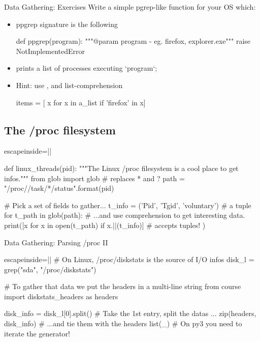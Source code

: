 \begin{pyframe}{Data Gathering: Exercises}
Write a simple pgrep-like function for your OS which:
\begin{itemize}
\item ppgrep signature is the following
\begin{pycode}
def ppgrep(program):
    """@param program - eg. firefox, explorer.exe"""
    raise NotImplementedError
\end{pycode}
\item prints a list of processes executing `program`;
\item Hint: use , and list-comprehension
\begin{pycode}
items = [ x for x in a_list if 'firefox' in x]
\end{pycode}
\end{itemize}
\end{pyframe}


\subsection{The /proc filesystem}
\begin{pyframe}{}
\begin{pycode*}{escapeinside=||}

def linux_threads(pid):
  """The Linux /proc filesystem is a cool place to get infos."""
  from glob import glob  # replaces * and ?
  path = "/proc/{}/task/*/status".format(pid)

  # Pick a set of fields to gather...
  t_info = ('Pid', 'Tgid', 'voluntary') # a tuple
  for t_path in glob(path):
    # ...and use comprehension to get interesting data.
    print([x for x in open(t_path)
        if x.||(t_info)] #  accepts tuples!
    )
\end{pycode*}
\end{pyframe}



\begin{pyframe}{Data Gathering: Parsing /proc II}
\begin{pycode*}{escapeinside=||}
# On Linux, /proc/diskstats is the source of I/O infos
disk_l = grep("sda", "/proc/diskstats")

# To gather that data we put the headers in a multi-line string
from course import diskstats_headers as headers

disk_info = disk_l[0].split() # Take the 1st entry, split the datas ...
zip(headers, disk_info)          # ...and tie them with the headers
list(_) # On py3 you need to iterate the generator!
\end{pycode*}
\end{pyframe}

